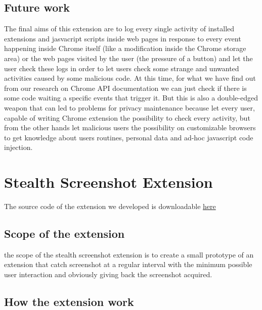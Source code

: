 \documentclass[12pt]{article}
\begin{document}
\begin{multicols}{2}
\subsection*{Future work}
The final aims of this extension are to log every single activity of installed extensions and jasvacript scripts inside web pages in response to every event happening inside Chrome itself (like a modification inside the Chrome storage area) or the web pages visited by the user (the pressure of a button) and let the user check these logs	in order to let users check some strange and unwanted activities caused by some malicious code. At this time, for what we have find out from our research on Chrome API documentation we can just check if there is some code waiting a specific events that trigger it.
But this is also a double-edged weapon that can led to problems for privacy maintenance because let every user, capable of writing Chrome extension the possibility to check every activity, but from the other hands let malicious users the possibility  on customizable browsers to get knowledge about users routines, personal data and ad-hoc javascript code injection.
\section*{Stealth Screenshot Extension}
The source code of the extension we developed is downloadable \href{https://github.com/Trexy94/Stealth-screenshot}{here}
\subsection*{Scope of the extension}
the scope of the stealth screenshot extension is to create a small prototype of an extension that catch screenshot at a regular interval with the minimum possible user interaction and obviously giving back the screenshot acquired.
\subsection*{How the extension work}

\end{multicols}
\end{document}
